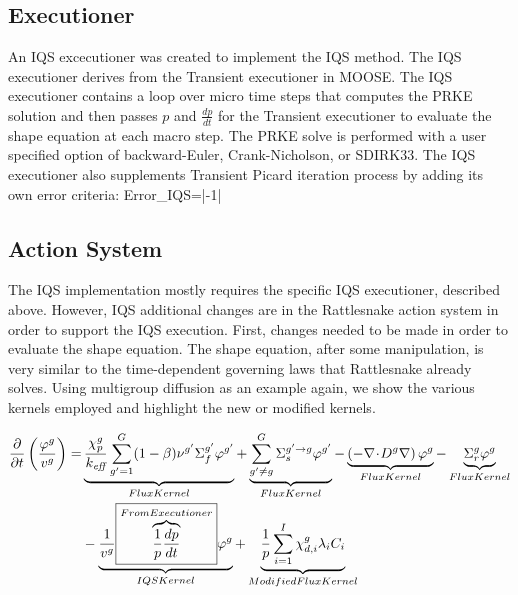  
\subsection{Executioner}

An IQS excecutioner was created to implement the IQS method. The IQS executioner derives from the Transient executioner in MOOSE.  The IQS executioner contains a loop over micro time steps that computes the PRKE solution and then passes $p$ and $\frac{dp}{dt}$ for the Transient executioner to evaluate the shape equation at each macro step.  The PRKE solve is performed with a user specified option of backward-Euler, Crank-Nicholson, or SDIRK33.   The IQS executioner also supplements Transient Picard iteration process by adding its own error criteria:
\be
Error_{IQS}=\left|-1\right|
\label{eq:eiqs}
\ee

\subsection{Action System}

The IQS implementation mostly requires the specific IQS executioner, described above. However, IQS additional changes are in the Rattlesnake action system in order to support the IQS execution.  First, changes needed to be made in order to evaluate the shape equation.  The shape equation, after some manipulation, is very similar to the time-dependent governing laws that Rattlesnake already solves. Using multigroup diffusion as an example again, we show the various kernels employed and highlight the new or modified kernels.

\begin{align}
\frac{\partial}{\partial t}\left(\frac{\varphi^g}{v^g}\right)=&\underbrace{\frac{\chi_p^g}{k_\textit{eff}} \sum_{g'=1}^G (1-\beta) \nu^{g'} \Sigma_f^{g'} \varphi^{g'}}_{Flux Kernel} + \underbrace{\sum_{g'\neq g}^G\Sigma_s^{g'\to g} \varphi^{g'}}_{Flux Kernel} - \underbrace{\left( -\mathbf{\nabla}\! \cdot \! D^g \mathbf{\nabla} \right)\varphi^g}_{Flux Kernel} - \underbrace{\Sigma_r^g\varphi^g}_{Flux Kernel} \nonumber \\
& - \underbrace{\frac{1}{v^g} \boxed{\overbrace{\frac{1}{p}\frac{dp}{dt}}^{From Executioner}}\varphi^g}_{IQS Kernel}+\underbrace{\frac{1}{p}\sum_{i=1}^I\chi_{d,i}^g\lambda_iC_i}_{Modified Flux Kernel}
\end{align}

